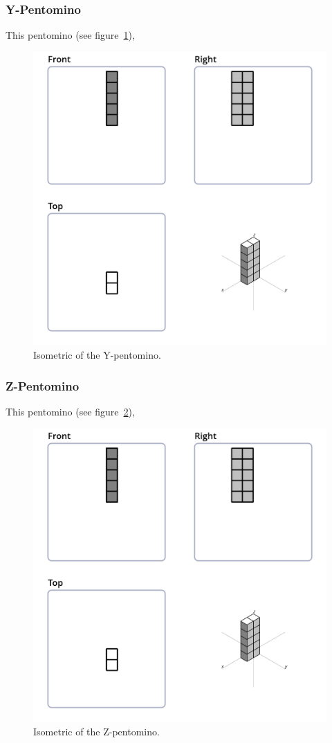 \subsubsection{Y-Pentomino}
\label{sec:y-pentomino}
This pentomino (see figure~\ref{fig:iso-pent-y}),


\begin{figure}
	\centering
	\includegraphics[scale=0.3]{iso_diagrams/o.png}
	\caption{Isometric of the Y-pentomino.}
  \label{fig:iso-pent-y}
\end{figure}
\subsubsection{Z-Pentomino}
\label{sec:z-pentomino}
This pentomino (see figure~\ref{fig:iso-pent-z}),


\begin{figure}
	\centering
	\includegraphics[scale=0.3]{iso_diagrams/o.png}
	\caption{Isometric of the Z-pentomino.}
  \label{fig:iso-pent-z}
\end{figure}
